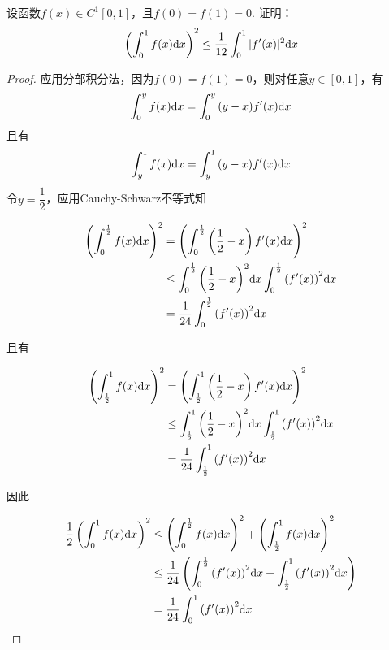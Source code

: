 \begin{proposition}
    
    设函数$f(x) \in C^1[0, 1]$，且$f(0) = f(1) = 0$. 证明：
    \[\left( \int_{0}^{1}{f(x)}\mathrm{d} x \right)^2 \leq \dfrac{1}{12} \int_{0}^{1}{|f'(x)|^2}\mathrm{d} x\]

\end{proposition}

\begin{proof}

    应用分部积分法，因为$f(0) = f(1) = 0$，则对任意$y \in [0, 1]$，有
    \[\int_{0}^{y}{f(x)}\mathrm{d} x = \int_{0}^{y}{(y - x)f'(x)}\mathrm{d} x\]
    且有
    \[\int_{y}^{1}{f(x)}\mathrm{d} x = \int_{y}^{1}{(y - x)f'(x)}\mathrm{d} x\]
    令$y = \dfrac{1}{2}$，应用\textup{Cauchy-Schwarz}不等式知
    
    \begin{align*}
        \left( \int_{0}^{\frac{1}{2}}{f(x)}\mathrm{d} x \right)^2 & = \left( \int_{0}^{\frac{1}{2}}{\left( \dfrac{1}{2} - x \right)f'(x)}\mathrm{d} x \right)^2 \\
        & \leq \int_{0}^{\frac{1}{2}}{\left( \dfrac{1}{2} - x \right)^2}\mathrm{d} x \int_{0}^{\frac{1}{2}}{\left( f'(x) \right)^2}\mathrm{d} x \\
        & = \dfrac{1}{24} \int_{0}^{\frac{1}{2}}{\left( f'(x) \right)^2}\mathrm{d} x
    \end{align*}

    且有

    \begin{align*}
        \left( \int_{\frac{1}{2}}^{1}{f(x)}\mathrm{d} x \right)^2 & = \left( \int_{\frac{1}{2}}^{1}{\left( \dfrac{1}{2} - x \right)f'(x)}\mathrm{d} x \right)^2 \\
        & \leq \int_{\frac{1}{2}}^{1}{\left( \dfrac{1}{2} - x \right)^2}\mathrm{d} x \int_{\frac{1}{2}}^{1}{\left( f'(x) \right)^2}\mathrm{d} x \\
        & = \dfrac{1}{24} \int_{\frac{1}{2}}^{1}{\left( f'(x) \right)^2}\mathrm{d} x
    \end{align*}

    因此

    \begin{align*}
        \dfrac{1}{2} \left( \int_{0}^{1}{f(x)}\mathrm{d} x \right)^2 & \leq \left( \int_{0}^{\frac{1}{2}}{f(x)}\mathrm{d} x \right)^2 + \left( \int_{\frac{1}{2}}^{1}{f(x)}\mathrm{d} x \right)^2 \\
        & \leq \dfrac{1}{24} \left( \int_{0}^{\frac{1}{2}}{\left( f'(x) \right)^2}\mathrm{d} x + \int_{\frac{1}{2}}^{1}{\left( f'(x) \right)^2}\mathrm{d} x \right) \\
        & = \dfrac{1}{24} \int_{0}^{1}{\left( f'(x) \right)^2}\mathrm{d} x
    \end{align*}

\end{proof}

